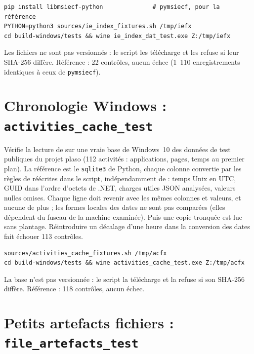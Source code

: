 \documentclass[11pt,a4paper,oneside]{report}
\begin{document}
\begin{lstlisting}
pip install libmsiecf-python              # pymsiecf, pour la référence
PYTHON=python3 sources/ie_index_fixtures.sh /tmp/iefx
cd build-windows/tests && wine ie_index_dat_test.exe Z:/tmp/iefx
\end{lstlisting}

Les fichiers ne sont pas versionnés : le script les télécharge et les refuse
si leur SHA-256 diffère. Référence : 22 contrôles, aucun échec (1~110
enregistrements identiques à ceux de \texttt{pymsiecf}).

\section{Chronologie Windows : \texttt{activities\_cache\_test}}

Vérifie la lecture de  sur une vraie base de
Windows~10 des données de test publiques du projet plaso (112 activités :
applications, pages, temps au premier plan). La référence est le
\texttt{sqlite3} de Python, chaque colonne convertie par les règles de
 réécrites dans le script, indépendamment de
\wac{} : temps Unix en UTC, GUID dans l'ordre d'octets de .NET, charges
utiles JSON analysées, valeurs nulles omises. Chaque ligne doit revenir avec
les mêmes colonnes et valeurs, et aucune de plus ; les formes locales des
dates ne sont pas comparées (elles dépendent du fuseau de la machine
examinée). Puis une copie tronquée est lue sans plantage. Réintroduire un
décalage d'une heure dans la conversion des dates fait échouer 113 contrôles.

\begin{lstlisting}
sources/activities_cache_fixtures.sh /tmp/acfx
cd build-windows/tests && wine activities_cache_test.exe Z:/tmp/acfx
\end{lstlisting}

La base n'est pas versionnée : le script la télécharge et la refuse si son
SHA-256 diffère. Référence : 118 contrôles, aucun échec.

\section{Petits artefacts fichiers : \texttt{file\_artefacts\_test}}
\end{document}
